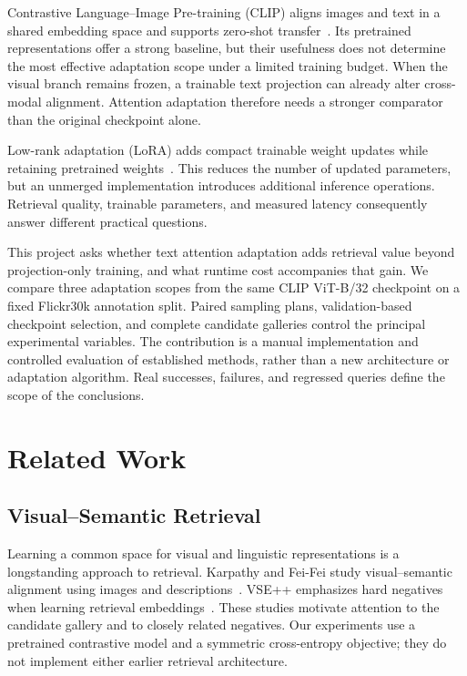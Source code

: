 \documentclass[conference]{IEEEtran}
\begin{document}
Contrastive Language--Image Pre-training (CLIP) aligns images and text in a shared embedding space and supports zero-shot transfer~\cite{radford2021clip}. Its pretrained representations offer a strong baseline, but their usefulness does not determine the most effective adaptation scope under a limited training budget. When the visual branch remains frozen, a trainable text projection can already alter cross-modal alignment. Attention adaptation therefore needs a stronger comparator than the original checkpoint alone.

Low-rank adaptation (LoRA) adds compact trainable weight updates while retaining pretrained weights~\cite{hu2022lora}. This reduces the number of updated parameters, but an unmerged implementation introduces additional inference operations. Retrieval quality, trainable parameters, and measured latency consequently answer different practical questions.

This project asks whether text attention adaptation adds retrieval value beyond projection-only training, and what runtime cost accompanies that gain. We compare three adaptation scopes from the same CLIP ViT-B/32 checkpoint on a fixed Flickr30k annotation split. Paired sampling plans, validation-based checkpoint selection, and complete candidate galleries control the principal experimental variables. The contribution is a manual implementation and controlled evaluation of established methods, rather than a new architecture or adaptation algorithm. Real successes, failures, and regressed queries define the scope of the conclusions.

\section{Related Work}
\subsection{Visual--Semantic Retrieval}
Learning a common space for visual and linguistic representations is a longstanding approach to retrieval. Karpathy and Fei-Fei study visual--semantic alignment using images and descriptions~\cite{karpathy2015alignments}. VSE++ emphasizes hard negatives when learning retrieval embeddings~\cite{faghri2018vse}. These studies motivate attention to the candidate gallery and to closely related negatives. Our experiments use a pretrained contrastive model and a symmetric cross-entropy objective; they do not implement either earlier retrieval architecture.
\end{document}
